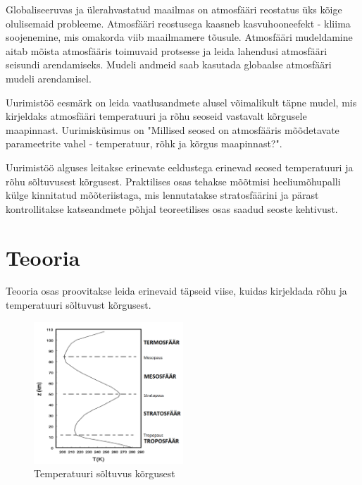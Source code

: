 \documentclass{trkut}%
\begin{document}
\maketitle%
\tableofcontents%

\nummerdame%
Globaliseeruvas ja ülerahvastatud maailmas on atmosfääri reostatus üks kõige olulisemaid probleeme. Atmosfääri reostusega kaasneb kasvuhooneefekt - kliima soojenemine, mis omakorda viib maailmamere tõusule. Atmosfääri mudeldamine aitab mõista atmosfääris toimuvaid protsesse ja leida lahendusi atmosfääri seisundi arendamiseks. Mudeli andmeid saab kasutada globaalse atmosfääri mudeli arendamisel.

Uurimistöö eesmärk on leida vaatlusandmete alusel võimalikult täpne mudel, mis kirjeldaks atmosfääri temperatuuri ja rõhu seoseid vastavalt kõrgusele maapinnast. Uurimisküsimus on "Millised seosed on atmosfääris mõõdetavate parameetrite vahel - temperatuur, rõhk ja kõrgus maapinnast?".

Uurimistöö alguses leitakse erinevate eeldustega erinevad seosed temperatuuri ja rõhu sõltuvusest kõrgusest. Praktilises osas tehakse mõõtmisi heeliumõhupalli külge kinnitatud mõõteriistaga, mis lennutatakse stratosfäärini ja pärast kontrollitakse katseandmete põhjal teoreetilises osas saadud seoste kehtivust.





\chapter{Teooria}
Teooria osas proovitakse leida erinevaid täpseid viise, kuidas kirjeldada rõhu ja temperatuuri sõltuvust kõrgusest.

\begin{figure}[h]
	\includegraphics[width=0.5\textwidth]{Profile2.png}
	\caption{Temperatuuri sõltuvus kõrgusest}
	\label{profile}%
\end{figure}
\end{document}
